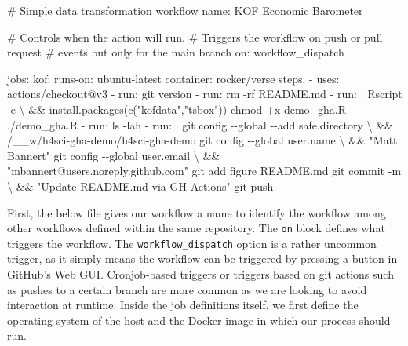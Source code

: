 \documentclass[
  12pt,
  letterpaper,
]{krantz}
\newenvironment{Shaded}{\begin{snugshade}}{\end{snugshade}}
\newcommand{\AttributeTok}[1]{\textcolor[rgb]{0.40,0.45,0.13}{#1}}
\newcommand{\CharTok}[1]{\textcolor[rgb]{0.13,0.47,0.30}{#1}}
\newcommand{\CommentTok}[1]{\textcolor[rgb]{0.37,0.37,0.37}{#1}}
\newcommand{\FunctionTok}[1]{\textcolor[rgb]{0.28,0.35,0.67}{#1}}
\newcommand{\KeywordTok}[1]{\textcolor[rgb]{0.00,0.23,0.31}{#1}}
\newcommand{\NormalTok}[1]{\textcolor[rgb]{0.00,0.23,0.31}{#1}}
\begin{document}
\begin{Shaded}
\begin{Highlighting}[]
\CommentTok{\# Simple data transformation workflow}
\FunctionTok{name}\KeywordTok{:}\AttributeTok{ KOF Economic Barometer}

\CommentTok{\# Controls when the action will run. }
\CommentTok{\# Triggers the workflow on push or pull request}
\CommentTok{\# events but only for the main branch}
\FunctionTok{on}\KeywordTok{:}
\AttributeTok{  workflow\_dispatch}

\FunctionTok{jobs}\KeywordTok{:}
\AttributeTok{  }\FunctionTok{kof}\KeywordTok{:}
\AttributeTok{    }\FunctionTok{runs{-}on}\KeywordTok{:}\AttributeTok{ ubuntu{-}latest}
\AttributeTok{    }\FunctionTok{container}\KeywordTok{:}\AttributeTok{ rocker/verse}
\AttributeTok{    }\FunctionTok{steps}\KeywordTok{:}
\AttributeTok{      }\KeywordTok{{-}}\AttributeTok{ }\FunctionTok{uses}\KeywordTok{:}\AttributeTok{ actions/checkout@v3}
\AttributeTok{      }\KeywordTok{{-}}\AttributeTok{ }\FunctionTok{run}\KeywordTok{:}\AttributeTok{ git version}
\AttributeTok{      }\KeywordTok{{-}}\AttributeTok{ }\FunctionTok{run}\KeywordTok{:}\AttributeTok{ rm {-}rf README.md}
\KeywordTok{      {-} }\FunctionTok{run}\KeywordTok{:}\AttributeTok{ }\CharTok{|}
\NormalTok{          Rscript {-}e \textbackslash{} }
\NormalTok{          \&\& \textquotesingle{}install.packages(c("kofdata","tsbox"))\textquotesingle{}}
\NormalTok{          chmod +x demo\_gha.R}
\NormalTok{          ./demo\_gha.R}
\AttributeTok{      }\KeywordTok{{-}}\AttributeTok{ }\FunctionTok{run}\KeywordTok{:}\AttributeTok{ ls {-}lah}
\KeywordTok{      {-} }\FunctionTok{run}\KeywordTok{:}\AttributeTok{ }\CharTok{|}
\NormalTok{          git config {-}{-}global {-}{-}add safe.directory \textbackslash{}}
\NormalTok{          \&\& /\_\_w/h4sci{-}gha{-}demo/h4sci{-}gha{-}demo}
\NormalTok{          git config {-}{-}global user.name \textbackslash{}}
\NormalTok{          \&\& "Matt Bannert"}
\NormalTok{          git config {-}{-}global user.email \textbackslash{}}
\NormalTok{          \&\& "mbannert@users.noreply.github.com"}
\NormalTok{          git add figure README.md}
\NormalTok{          git commit {-}m \textbackslash{}}
\NormalTok{          \&\& "Update README.md via GH Actions"}
\NormalTok{          git push}
\end{Highlighting}
\end{Shaded}

First, the below file gives our workflow a name to identify the workflow
among other workflows defined within the same repository. The
\texttt{on} block defines what triggers the workflow. The
\texttt{workflow\_dispatch} option is a rather uncommon trigger, as it
simply means the workflow can be triggered by pressing a button in
GitHub's Web GUI. Cronjob-based triggers or triggers based on git
actions such as pushes to a certain branch are more common as we are
looking to avoid interaction at runtime. Inside the job definitions
itself, we first define the operating system of the host and the
Docker image in which our process should run.
\end{document}

